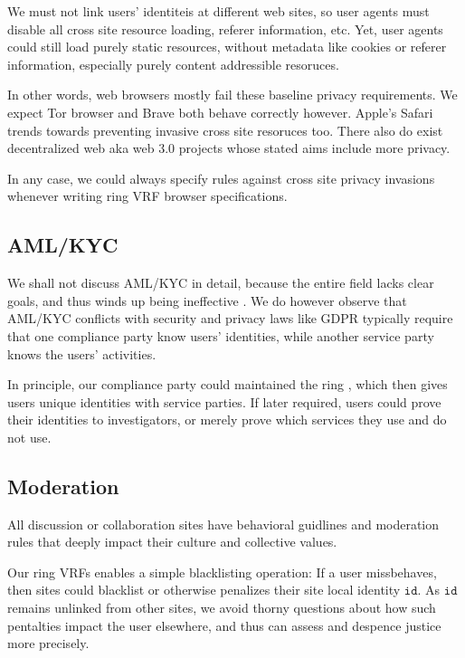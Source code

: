 We must not link users' identiteis at different web sites, so user agents
must disable all cross site resource loading, referer information, etc.
Yet, user agents could still load purely static resources, without metadata
like cookies or referer information, especially purely content addressible
resoruces.

In other words, web browsers mostly fail these baseline privacy requirements.
We expect Tor browser and Brave both behave correctly however.
Apple's Safari trends towards preventing invasive cross site resoruces too.  
There also do exist decentralized web aka web 3.0 projects whose stated aims
include more privacy.

In any case, we could always specify rules against cross site privacy invasions
whenever writing ring VRF browser specifications.


\subsection{AML/KYC}

We shall not discuss AML/KYC in detail, because the entire field lacks
clear goals, and thus winds up being ineffective
 \cite{doi:10.1080/25741292.2020.1725366}.
We do however observe that AML/KYC conflicts with security and privacy
laws like GDPR typically require that one compliance party know users'
identities, while another service party knows the users' activities.

In principle, our compliance party could maintained the ring \ctx,
which then gives users unique identities with service parties.
If later required, users could prove their identities to investigators,
or merely prove which services they use and do not use. 


\subsection{Moderation}
\label{subsec:moderation}

All discussion or collaboration sites have behavioral guidlines and
moderation rules that deeply impact their culture and collective values.

Our ring VRFs enables a simple blacklisting operation:
If a user missbehaves, then sites could blacklist or otherwise penalizes
their site local identity $\mathtt{id}$.
As $\mathtt{id}$ remains unlinked from other sites, we avoid thorny
questions about how such pentalties impact the user elsewhere, and thus
can assess and despence justice more precisely. 

